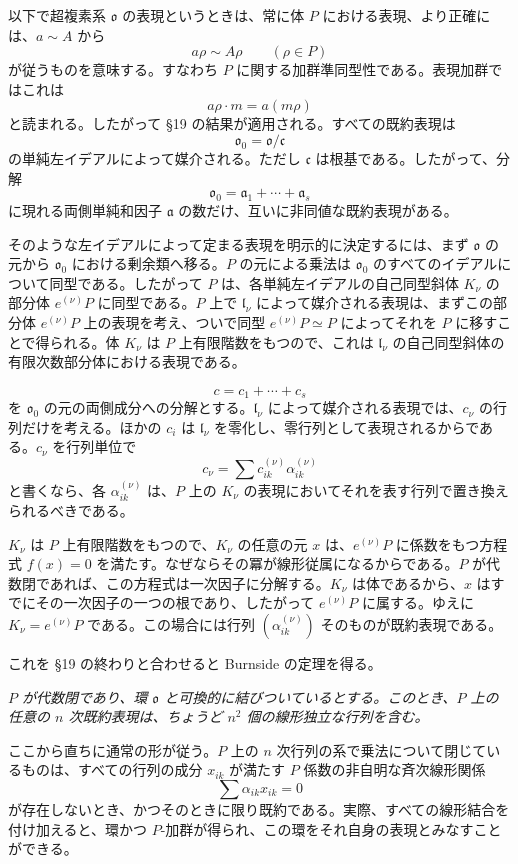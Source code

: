 \documentclass[11pt]{article}
\providecommand{\mo}{\mathfrak{o}}
\providecommand{\ma}{\mathfrak{a}}
\providecommand{\mc}{\mathfrak{c}}
\providecommand{\ml}{\mathfrak{l}}
\begin{document}
以下で超複素系 $\mo$ の表現というときは、常に体 $P$ における表現、より正確には、$a\sim A$ から
\[
        a\rho\sim A\rho\qquad(\rho\in P)
\]
が従うものを意味する。すなわち $P$ に関する加群準同型性である。表現加群ではこれは
\[
        a\rho\cdot m=a(m\rho)
\]
と読まれる。したがって §19 の結果が適用される。すべての既約表現は
\[
        \mo_0=\mo/\mc
\]
の単純左イデアルによって媒介される。ただし $\mc$ は根基である。したがって、分解
\[
        \mo_0=\ma_1+\cdots+\ma_s
\]
に現れる両側単純和因子 $\ma$ の数だけ、互いに非同値な既約表現がある。

そのような左イデアルによって定まる表現を明示的に決定するには、まず $\mo$ の元から $\mo_0$ における剰余類へ移る。$P$ の元による乗法は $\mo_0$ のすべてのイデアルについて同型である。したがって $P$ は、各単純左イデアルの自己同型斜体 $K_\nu$ の部分体 $e^{(\nu)}P$ に同型である。$P$ 上で $\ml_\nu$ によって媒介される表現は、まずこの部分体 $e^{(\nu)}P$ 上の表現を考え、ついで同型 $e^{(\nu)}P\simeq P$ によってそれを $P$ に移すことで得られる。体 $K_\nu$ は $P$ 上有限階数をもつので、これは $\ml_\nu$ の自己同型斜体の有限次数部分体における表現である。

\[
        c=c_1+\cdots+c_s
\]
を $\mo_0$ の元の両側成分への分解とする。$\ml_\nu$ によって媒介される表現では、$c_\nu$ の行列だけを考える。ほかの $c_i$ は $\ml_\nu$ を零化し、零行列として表現されるからである。$c_\nu$ を行列単位で
\[
        c_\nu=\sum c_{ik}^{(\nu)}\alpha_{ik}^{(\nu)}
\]
と書くなら、各 $\alpha_{ik}^{(\nu)}$ は、$P$ 上の $K_\nu$ の表現においてそれを表す行列で置き換えられるべきである。

$K_\nu$ は $P$ 上有限階数をもつので、$K_\nu$ の任意の元 $x$ は、$e^{(\nu)}P$ に係数をもつ方程式 $f(x)=0$ を満たす。なぜならその冪が線形従属になるからである。$P$ が代数閉であれば、この方程式は一次因子に分解する。$K_\nu$ は体であるから、$x$ はすでにその一次因子の一つの根であり、したがって $e^{(\nu)}P$ に属する。ゆえに $K_\nu=e^{(\nu)}P$ である。この場合には行列 $(\alpha_{ik}^{(\nu)})$ そのものが既約表現である。

これを §19 の終わりと合わせると Burnside の定理を得る。

\emph{$P$ が代数閉であり、環 $\mo$ と可換的に結びついているとする。このとき、$P$ 上の任意の $n$ 次既約表現は、ちょうど $n^2$ 個の線形独立な行列を含む。}

ここから直ちに通常の形が従う。$P$ 上の $n$ 次行列の系で乗法について閉じているものは、すべての行列の成分 $x_{ik}$ が満たす $P$ 係数の非自明な斉次線形関係
\[
        \sum \alpha_{ik}x_{ik}=0
\]
が存在しないとき、かつそのときに限り既約である。実際、すべての線形結合を付け加えると、環かつ $P$-加群が得られ、この環をそれ自身の表現とみなすことができる。
\end{document}
